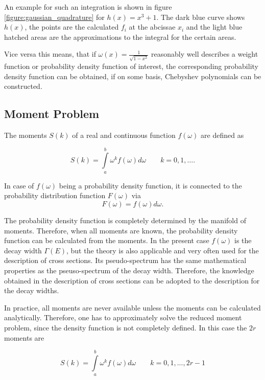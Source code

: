 An example for such an integration is shown in figure \ref{figure:gaussian_quadrature}
for $h(x) = x^3 + 1$. The dark blue curve shows $h(x)$, the points are the
calculated $f_i$ at the abcissae $x_i$ and the light blue hatched areas are the
approximations to the integral for the certain areas.

Vice versa this means, that if $\omega(x) = \frac {1}{\sqrt{1-x^2}}$ reasonably
well describes a weight function or probability density function of interest,
the corresponding probability density function can be obtained, if on some basis,
Chebyshev polynomials
can be constructed.


\subsection{Moment Problem}

The moments $S(k)$ of a real and continuous function $f(\omega)$ are defined
as

\begin{equation}
  S(k) = \int\limits_a^b \omega^k f(\omega) d\omega \quad\quad k=0,1,\dots  .
\end{equation}

In case of $f(\omega)$ being a probability density function, it is connected
to the probability distribution function $F(\omega)$ via
\begin{equation}
  F(\omega) = f(\omega){d\omega} .
\end{equation}

The probability density function is completely determined by the manifold
of moments. Therefore, when all moments are known, the probability density
function can be calculated from the moments. In the present case $f(\omega)$
is the decay width $\Gamma(E)$, but the theory is also applicable and very often
used for the description of cross sections. Its pseudo-spectrum has the same
mathematical properties as the pseuso-spectrum of the decay width. Therefore,
the knowledge obtained in the description of cross sections can be adopted to
the description for the decay widths.

In practice, all moments are never available unless the moments can be
calculated analytically. Therefore, one has to approximately solve the reduced
moment problem, since the density function is not completely defined.
In this case the $2r$ moments are

\begin{equation}
  S(k) = \int\limits_a^b \omega^k f(\omega) d\omega \quad\quad k=0,1,...,2r-1
\end{equation}





